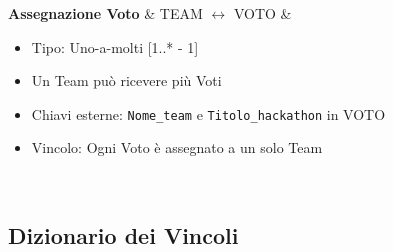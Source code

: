 \documentclass[a4paper, 10pt]{article}
\begin{document}
{\begin{longtable}
			\textbf{Assegnazione Voto} & 
			TEAM $\leftrightarrow$ VOTO &
			\begin{itemize}
				\item Tipo: Uno-a-molti [1..* - 1]
				\item Un Team può ricevere più Voti
				\item Chiavi esterne: \texttt{Nome\_team} e \texttt{Titolo\_hackathon} in VOTO
				\item Vincolo: Ogni Voto è assegnato a un solo Team
			\end{itemize} \\
			\hline
		\end{longtable}
	}
	\newpage
	\subsection{Dizionario dei Vincoli}
\end{document}
